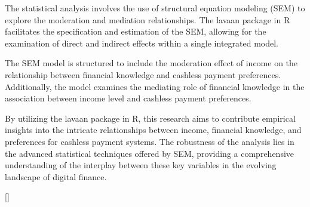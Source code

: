 \documentclass[
  super,
  preprint,
  3p]{elsarticle}
\begin{document}
The statistical analysis involves the use of structural equation
modeling (SEM) to explore the moderation and mediation relationships.
The lavaan package in R facilitates the specification and estimation of
the SEM, allowing for the examination of direct and indirect effects
within a single integrated model.

The SEM model is structured to include the moderation effect of income
on the relationship between financial knowledge and cashless payment
preferences. Additionally, the model examines the mediating role of
financial knowledge in the association between income level and cashless
payment preferences.

By utilizing the lavaan package in R, this research aims to contribute
empirical insights into the intricate relationships between income,
financial knowledge, and preferences for cashless payment systems. The
robustness of the analysis lies in the advanced statistical techniques
offered by SEM, providing a comprehensive understanding of the interplay
between these key variables in the evolving landscape of digital
finance.

{[}\citet{hayes2013}{]}\citep{coutts2022}

\citep{mackinnon2002}
\end{document}
